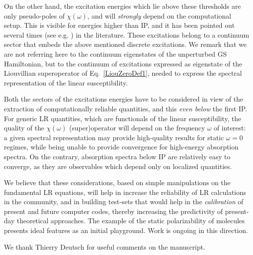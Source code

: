 \documentclass[reprint,aps,prb]{revtex4-1}
\begin{document}
On the other hand, the excitation energies which lie above these thresholds are only pseudo-poles of $\chi(\omega)$, 
and will \emph{strongly} depend on the computational setup. This is visible for energies higher than
IP, and it has been pointed out several times (see e.g. \cite{giustino2012,giustino2014}) in the literature.
These excitations belong to a continuum sector that embeds the above mentioned discrete excitations.
We remark that we are not referring here to the continuum eigenstates of the 
unperturbed GS Hamiltonian,
but to the continuum of excitations expressed as eigenstate of the 
Liouvillian superoperator of Eq.~\eqref{LiouZeroDef1}, needed to 
express the spectral representation of the linear susceptibility.

Both the sectors of the excitations energies have to be considered in view of the extraction of computationally reliable quantities, and this \emph{even below} the first IP.
For generic LR quantities, which are functionals of the linear susceptibility, 
the quality of the $\chi(\omega)$ (super)operator will depend
on the frequency $\omega$ of interest: a given spectral representation may provide high-quality results for static $\omega=0$ regimes, while being
unable to provide convergence for high-energy absorption spectra.
On the contrary, absorption spectra below IP are relatively easy to converge, as they are observables which depend only on localized quantities.

We believe that these considerations, based on simple manipulations on the fundamental LR equations, will help in increase
the reliability of LR calculations in the community, and in building test-sets that would help in
the \emph{calibration} of present and future computer codes, thereby increasing the predictivity of present-day theoretical approaches.
The example of the static polarizability of molecules
presents ideal features as an initial playground. Work is ongoing in this direction.

\begin{acknowledgments}
We thank Thierry Deutsch for useful comments on the manuscript.
\end{acknowledgments}

\appendix
\end{document}
